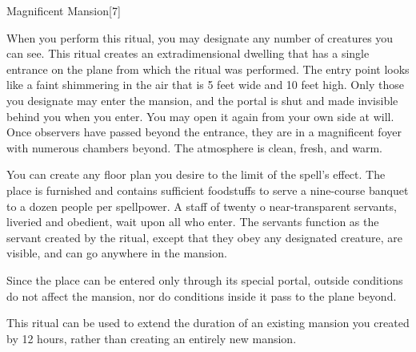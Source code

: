 \begin{spellsection}{Magnificent Mansion}[7]
    \begin{spellheader}
    \end{spellheader}
    \begin{spellcontent}
        \begin{spelltargetinginfo}
        \end{spelltargetinginfo}
        \begin{spelleffects}
            \spellspecial When you perform this ritual, you may designate any number of creatures you can see.
            \spelleffect This ritual creates an extradimensional dwelling that has a single entrance on the plane from which the ritual was performed. The entry point looks like a faint shimmering in the air that is 5 feet wide and 10 feet high. Only those you designate may enter the mansion, and the portal is shut and made invisible behind you when you enter. You may open it again from your own side at will. Once observers have passed beyond the entrance, they are in a magnificent foyer with numerous chambers beyond. The atmosphere is clean, fresh, and warm.
            \par You can create any floor plan you desire to the limit of the spell's effect. The place is furnished and contains sufficient foodstuffs to serve a nine-course banquet to a dozen people per spellpower. A staff of twenty o
            near-transparent servants, liveried and obedient, wait upon all who enter. The servants function as the servant created by the  ritual, except that they obey any designated creature, are visible, and can go anywhere in the mansion.
            \spelldur \durext \dismissable
        \end{spelleffects}
    \end{spellcontent}
    \begin{spellfooter}
        \spellnotes Since the place can be entered only through its special portal, outside conditions do not affect the mansion, nor do conditions inside it pass to the plane beyond.

        This ritual can be used to extend the duration of an existing mansion you created by 12 hours, rather than creating an entirely new mansion.
    \end{spellfooter}
    \begin{spellaugments}
    \end{spellaugments}
\end{spellsection}

